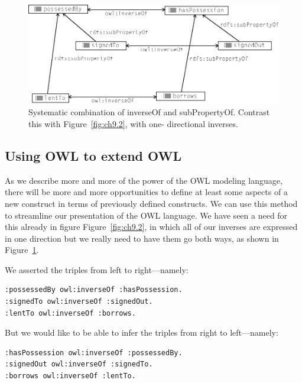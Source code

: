 \begin{figure}
\centering
\includegraphics[width=5in]{media/ch9/f09-003.eps}
\caption{Systematic combination of inverseOf and subPropertyOf. Contrast this
with Figure~\ref{fig:ch9.2}, with one- directional inverses.
}
\label{fig:ch9.3}
\end{figure}



\subsection{Using OWL to extend OWL}

As we describe more and more of the power of the OWL modeling language,
there will be more and more opportunities to define at least some
aspects of a new construct in terms of previously defined constructs. We
can use this method to streamline our presentation of the OWL language.
We have seen a need for this already in figure Figure~\ref{fig:ch9.2}, in which all
of our inverses are expressed in one direction but we really need to
have them go both ways, as shown in Figure~\ref{fig:ch9.3}.

We asserted the triples from left to right---namely:

\begin{lstlisting}
:possessedBy owl:inverseOf :hasPossession.
:signedTo owl:inverseOf :signedOut.
:lentTo owl:inverseOf :borrows.
\end{lstlisting}

But we would like to be able to infer the triples from right to
left---namely:

\begin{lstlisting}
:hasPossession owl:inverseOf :possessedBy.
:signedOut owl:inverseOf :signedTo.
:borrows owl:inverseOf :lentTo.
\end{lstlisting}

